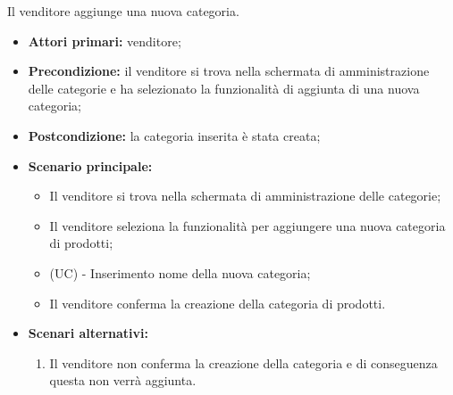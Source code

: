 Il venditore aggiunge una nuova categoria.
\begin{itemize}
    \item \textbf{Attori primari:} venditore;
    \item \textbf{Precondizione:} il venditore si trova nella schermata di amministrazione delle categorie e ha selezionato la funzionalità di aggiunta di una nuova categoria;
    \item \textbf{Postcondizione:} la categoria inserita è stata creata;
    \item \textbf{Scenario principale:}
    \begin{itemize}
    	\item Il venditore si trova nella schermata di amministrazione delle categorie;
    	\item Il venditore seleziona la funzionalità per aggiungere una nuova categoria di prodotti;
    	\item (UC) - Inserimento nome della nuova categoria;
    	\item Il venditore conferma la creazione della categoria di prodotti.
    \end{itemize} 
    \item \textbf{Scenari alternativi:}
    \begin{enumerate}[label=\lett]
    	\item Il venditore non conferma la creazione della categoria e di conseguenza questa non verrà aggiunta.
    \end{enumerate}
\end{itemize}

\resetSubUC

